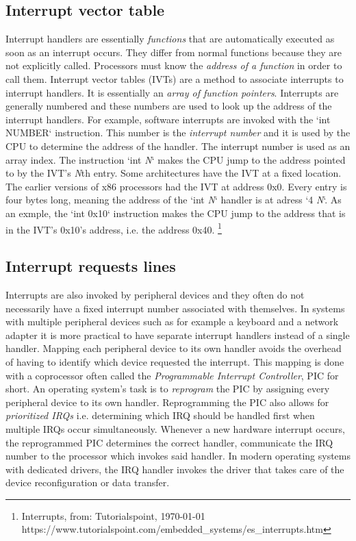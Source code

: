 \subsection{Interrupt vector table}

Interrupt handlers are essentially \textit{functions} that are automatically executed as soon as an
interrupt occurs. They differ from normal functions because they are not explicitly called.
Processors must know the \textit{address of a function} in order to call them. Interrupt vector
tables (IVTs) are a method to associate interrupts to interrupt handlers. It is essentially an
\textit{array of function pointers}. Interrupts are generally numbered and these numbers are used to look up 
the address of the interrupt handlers. For example, software interrupts are invoked with the `int 
\<NUMBER\>` instruction. This number is the \textit{interrupt number} and it is used by the CPU to determine 
the address of the handler. The interrupt number is used as an array index. The instruction `int \textit{N}` 
makes the CPU jump to the address pointed to by the IVT's \textit{N}th entry. Some architectures have the IVT
at a fixed location. The earlier versions of x86 processors had the IVT at address 0x0. Every entry
is four bytes long, meaning the address of the `int \textit{N}` handler is at adress `4 \* \textit{N}`. As an exmple,
the `int 0x10` instruction makes the CPU jump to the address that is in the IVT's 0x10's address,
i.e. the address 0x40. \footnote{Interrupts, from: Tutorialspoint, \today  \\ https://www.tutorialspoint.com/embedded_systems/es_interrupts.htm}

\subsection{Interrupt requests lines}

Interrupts are also invoked by peripheral devices and they often do not necessarily have a fixed 
interrupt number associated with themselves. In systems with multiple peripheral devices such as for 
example a keyboard and a network adapter it is more practical to have separate interrupt handlers
instead of a single handler. Mapping each peripheral device to its own handler avoids the overhead of 
having to identify which device requested the interrupt. This mapping is done with a coprocessor often
called the \textit{Programmable Interrupt Controller}, PIC for short. An operating system's task is to
\textit{reprogram} the PIC by assigning every peripheral device to its own handler. Reprogramming the PIC also
allows for \textit{prioritized IRQs} i.e. determining which IRQ should be handled first when multiple IRQs 
occur simultaneously. Whenever a new hardware interrupt occurs, the reprogrammed PIC determines
the correct handler, communicate the IRQ number to the processor which invokes said handler. In
modern operating systems with dedicated drivers, the IRQ handler invokes the driver that takes
care of the device reconfiguration or data transfer.
